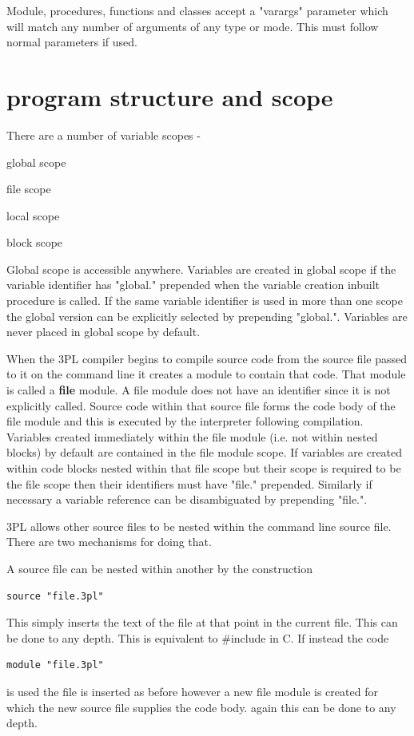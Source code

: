         Module, procedures, functions and classes accept a "varargs" parameter which will
        match any number of arguments of any type or mode. This must follow normal
        parameters if used.




    \section{program structure and scope}

        There are a number of variable scopes -

        \blist
        \item   global scope
        \item   file scope
        \item   local scope
        \item   block scope
        \blend

        Global scope is accessible anywhere. Variables are created in global scope if
        the variable identifier has "global." prepended when the variable creation
        inbuilt procedure is called. If the same variable identifier is used in more
        than one scope the global version can be explicitly selected by prepending
        "global.". Variables are never placed in global scope by default.

        When the 3PL compiler begins to compile source code from the source file passed
        to it on the command line it creates a module to contain that code. That module
        is called a {\bf file} module. A file module does not have an identifier since
        it is not explicitly called. Source code within that source file forms the code
        body of the file module and this is executed by the interpreter following
        compilation. Variables created immediately within the file module (i.e. not
        within nested blocks) by default are contained in the file module scope.
        If variables are created within code blocks nested within that file
        scope but their scope is required to be the file scope then their
        identifiers must have "file." prepended. Similarly if necessary a variable
        reference can be disambiguated by prepending "file.".

        3PL allows other source files to be nested within the command line source
        file. There are two mechanisms for doing that.

        A source file can be nested within another by the construction    
        \begin{lstlisting}[language=threepl]
            source "file.3pl"
        \end{lstlisting}
        This simply inserts the text of the file at that point in the current file.
        This can be done to any depth.
        This is equivalent to \#include in C. If instead the code
        \begin{lstlisting}[language=threepl]
            module "file.3pl"
        \end{lstlisting}
        is used the file is inserted as before however a new file module is created
        for which the new source file supplies the code body. again this can be done to
        any depth.

